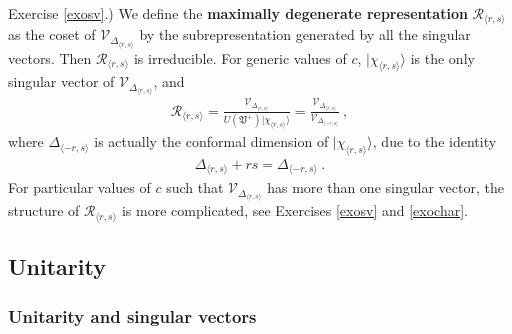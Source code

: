 \documentclass[12pt, a4paper, notitlepage, twoside]{report}
\numberwithin{equation}{section}
\theoremstyle{break}
\begin{document}
Exercise \ref{exosv}.) We define the \textbf{\boldmath maximally degenerate representation} $\mathcal{R}_{\langle r,s \rangle}$ as the coset of $\mathcal{V}_{\Delta_{\langle r,s \rangle}}$ by the subrepresentation generated by all the singular vectors. 
Then $\mathcal{R}_{\langle r,s \rangle}$ is irreducible.
For generic values of $c$, $|\chi_{\langle r,s \rangle}\rangle$ is the only singular vector of $\mathcal{V}_{\Delta_{\langle r,s \rangle}}$, and 
\begin{align}
 \mathcal{R}_{\langle r,s\rangle} =\frac{\mathcal{V}_{\Delta_{\langle r,s \rangle}}}{U(\mathfrak{V}^+) |\chi_{\langle r,s \rangle}\rangle }
= \frac{\mathcal{V}_{\Delta_{\langle r,s \rangle}}}{\mathcal{V}_{\Delta_{\langle -r,s \rangle}} }\ ,
\end{align}
where $\Delta_{\langle -r,s \rangle}$ is actually the conformal dimension of $|\chi_{\langle r,s \rangle}\rangle$, due to the identity
\begin{align}
 \Delta_{\langle r,s \rangle} + rs = \Delta_{\langle -r,s \rangle}\ .
\label{dmr}
\end{align}
For particular values of $c$ such that $\mathcal{V}_{\Delta_{\langle r,s \rangle}}$ has more than one singular vector, the structure of $ \mathcal{R}_{\langle r,s\rangle}$ is more complicated, see Exercises \ref{exosv} and \ref{exochar}.



\subsection{Unitarity}\label{secuni}

\subsubsection{Unitarity and singular vectors}
\end{document}
